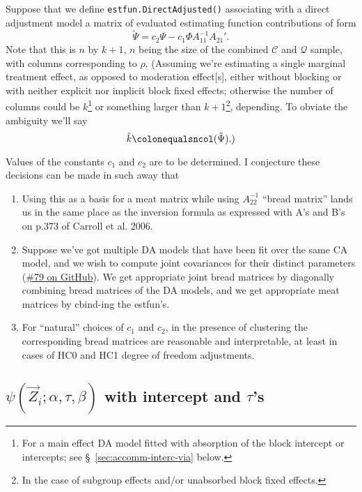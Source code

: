 \documentclass{article}
\newcommand{\defeq}{\ensuremath{\colonequals}}
\begin{document}
Suppose that we define \texttt{estfun.DirectAdjusted()} associating
with a direct adjustment model a matrix of evaluated estimating function
contributions of form
\begin{equation*}
  \tilde{\Psi} = c_{2}\Psi - c_{1}\Phi A_{11}^{-1}A_{21}'.
\end{equation*}
Note that this is $n$ by
$k+1$, $n$ being the size of the combined $\mathcal{C}$ and
$\mathcal{Q}$ sample, with columns corresponding to $\rho$.%
(Assuming we're estimating a single marginal treatment effect, as
opposed to moderation effect[s], either without blocking or with
neither explicit nor implicit block fixed effects; otherwise the
number of columns could be $k$\footnote{For a main effect
DA model fitted with absorption of the block intercept or
intercepts; see \S~\ref{sec:accomm-interc-via} below.} or something
larger than $k+1$\footnote{In the case of subgroup effects and/or unabsorbed block fixed effects.},
depending. To obviate the ambiguity we'll say
\begin{equation*}
  \tilde{k} \defeq \mathtt{ncol}(\tilde{\Psi}).)
\end{equation*}

Values of the constants $c_{1}$ and $c_{2}$ are to be determined.
I conjecture these decisions can be made in such away that 
\begin{enumerate}
\item Using this as a basis for a meat matrix while using
  $A_{22}^{-1}$  ``bread matrix'' lands us in the same place as the
  inversion formula as expressed with A's and B's on p.373 of Carroll
  et al. 2006.
\item Suppose we've got multiple DA models that have been fit over the
  same CA model, and we wish to compute joint covariances for their
  distinct parameters
  (\href{https://github.com/benbhansen-stats/flexida/issues/79}{\#79
    on GitHub}). We get appropriate joint bread matrices by
  diagonally combining bread matrices of the DA models, and we get
  appropriate meat matrices by cbind-ing the estfun's.
\item For ``natural'' choices of $c_{1}$ and $c_{2}$, in the
  presence of clustering the corresponding bread matrices are
  reasonable and interpretable, at least in cases of HC0 and HC1
  degree of freedom adjustments. 
\end{enumerate}

\subsection{$\psi(\vec{Z}_{i};
  \alpha, \tau, \beta)$ with intercept and $\tau$'s}
\label{sec:psit-rho_0-tau}
\end{document}

